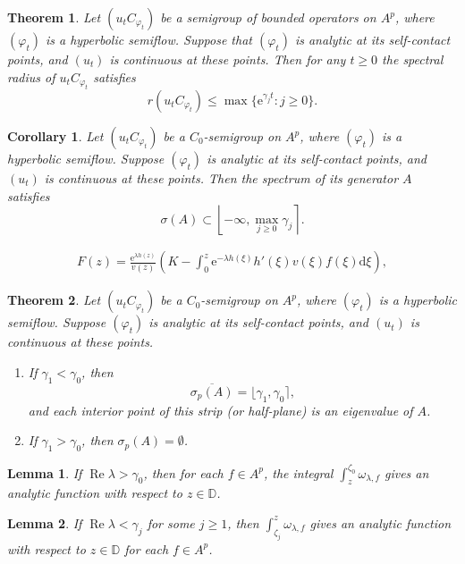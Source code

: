 \documentclass[10pt,a4paper]{amsart}
\newtheorem{theorem}{Theorem}
\newtheorem{corollary}{Corollary}
\newtheorem{lemma}{Lemma}
\begin{document}
\begin{theorem}\label{rad}
Let $(u_tC_{\varphi_t})$ be a semigroup of bounded operators on $A^p$, where $(\varphi_t)$ is a hyperbolic semiflow. Suppose that $(\varphi_t)$ is analytic at its self-contact points, and $(u_t)$ is continuous at these points. Then for any $t\geq0$ the spectral radius of $u_tC_{\varphi_t}$ satisfies
$$r(u_tC_{\varphi_t})\leq\max\bigl\{\mathrm{e}^{\gamma_j t} : j\geq0\bigr\}.$$
\end{theorem}

\begin{corollary}\label{spectralbound}
Let $(u_tC_{\varphi_t})$ be a $C_0$-semigroup on $A^p$, where $(\varphi_t)$ is a hyperbolic semiflow. Suppose $(\varphi_t)$ is analytic at its self-contact points, and $(u_t)$ is continuous at these points. Then the spectrum of its generator $A$ satisfies
$$\sigma(A)\subset\left\lfloor-\infty, \max_{j\geq 0}\gamma_j\right\rceil.$$
\end{corollary}

\begin{align}\label{difsolu}
F(z)=\frac{ \mathrm{e}^{\lambda h(z)}}{v(z)}\left(K-\int_0^z \mathrm{e}^{-\lambda h(\xi)}h'(\xi)v(\xi)f(\xi) \mathrm{d}\xi\right),
\end{align}

\begin{theorem}\label{eigenvalue}
Let $(u_tC_{\varphi_t})$ be a $C_0$-semigroup on $A^p$, where $(\varphi_t)$ is a hyperbolic semiflow. Suppose $(\varphi_t)$ is analytic at its self-contact points, and $(u_t)$ is continuous at these points.
\begin{enumerate}
\item If $\gamma_1<\gamma_0$, then 
$$\overline{\sigma_p(A)}=\lfloor\gamma_1,\gamma_0\rceil,$$
and each interior point of this strip  (or half-plane) is an eigenvalue of $A$.

\item  If $\gamma_1>\gamma_0$, then $\sigma_p(A)=\emptyset$.
\end{enumerate}
\end{theorem}

\begin{lemma}\label{jifenshoulian}
If $ \operatorname{Re}\lambda>\gamma_0$, then for each $f\in A^p$, the integral $\int_z^{\zeta_0}\omega_{\lambda,f}$ gives an analytic function with respect to $z\in\mathbb{D}$.
\end{lemma}

\begin{lemma}\label{zaibianyige}
If $\operatorname{Re}\lambda<\gamma_j$ for some $j\geq 1$, then $\int^z_{\zeta_j}\omega_{\lambda,f}$ gives an analytic function with respect to $z\in\mathbb{D}$ for each $f\in A^p$.
\end{lemma}
\end{document}
